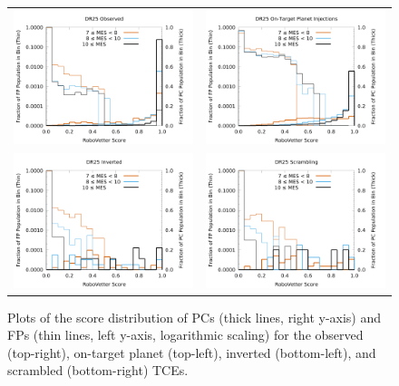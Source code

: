 \begin{figure}[ht]
\centering
\begin{tabular}{cc}
\includegraphics[width=0.48\linewidth]{Scores-OBS.png} &
\includegraphics[width=0.48\linewidth]{Scores-INJ1.png} \\
\includegraphics[width=0.48\linewidth]{Scores-INV.png} &
\includegraphics[width=0.48\linewidth]{Scores-SCR1.png} \\
\end{tabular}
\caption{Plots of the score distribution of PCs (thick lines, right y-axis) and FPs (thin lines, left y-axis, logarithmic scaling) for the observed (top-right), on-target planet (top-left), inverted (bottom-left), and scrambled (bottom-right) TCEs.}
\label{score-fig-2}
\end{figure}

